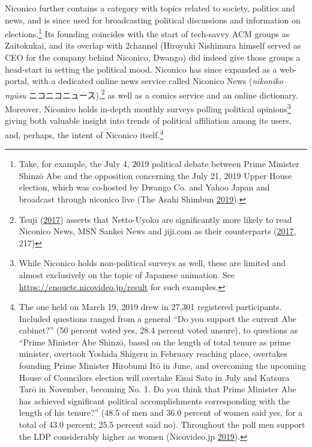 \documentclass[10pt,british,A4paper,oneside]{memoir}
\begin{document}
Niconico further contains a category with topics related to society,
politics and news, and is since used for broadcasting political
discussions and information on elections.\footnote{Take, for example,
  the July 4, 2019 political debate between Prime Minister Shinzō Abe
  and the opposition concerning the July 21, 2019 Upper House election,
  which was co-hosted by Dwango Co. and Yahoo Japan and broadcast
  through niconico live (The Asahi Shimbun
  \protect\hyperlink{ref-the_asahi_shimbun_constitutional_2019}{2019}).}
Its founding coincides with the start of tech-savvy ACM groups as
Zaitokukai, and its overlap with 2channel (Hiroyuki Nishimura himself
served as CEO for the company behind Niconico, Dwango) did indeed give
those groups a head-start in setting the political mood. Niconico has
since expanded as a web-portal, with a dedicated online news service
called Niconico News (\emph{nikoniko nyūsu} ニコニコニュース),\footnote{Tsuji
  (\protect\hyperlink{ref-tsuji_eng._2017}{2017}) asserts that
  Netto-Uyoku are significantly more likely to read Niconico News, MSN
  Sankei News and jiji.com as their counterparts
  (\protect\hyperlink{ref-tsuji_eng._2017}{2017}, 217)} as well as a
comics service and an online dictionary. Moreover, Niconico holds
in-depth monthly surveys polling political opinions\footnote{While
  Niconico holds non-political surveys as well, these are limited and
  almost exclusively on the topic of Japanese animation. See
  \url{https://enquete.nicovideo.jp/result} for such examples.} giving
both valuable insight into trends of political affiliation among its
users, and, perhaps, the intent of Niconico itself.\footnote{The one
  held on March 19, 2019 drew in 27,301 registered participants. Included
  questions ranged from a general ``Do you support the current Abe
  cabinet?'' (50 percent voted yes, 28.4 percent voted unsure), to
  questions as ``Prime Minister Abe Shinzō, based on the length of total
  tenure as prime minister, overtook Yoshida Shigeru in February
  reaching  place, overtakes founding Prime Minister Hirobumi Itō
  in June, and overcoming the upcoming House of Councilors election will
  overtake Eisai Sato in July and Katsura Tarō in November, becoming No.
  1. Do you think that Prime Minister Abe has achieved significant
  political accomplishments corresponding with the length of his
  tenure?'' (48.5 of men and 36.0 percent of women said yes, for a total
  of 43.0 percent; 25.5 percent said no). Throughout the poll men support the LDP considerably higher as women (Nicovideo.jp
  \protect\hyperlink{ref-nicovideo.jp_monthly_2019}{2019}).}
\end{document}
